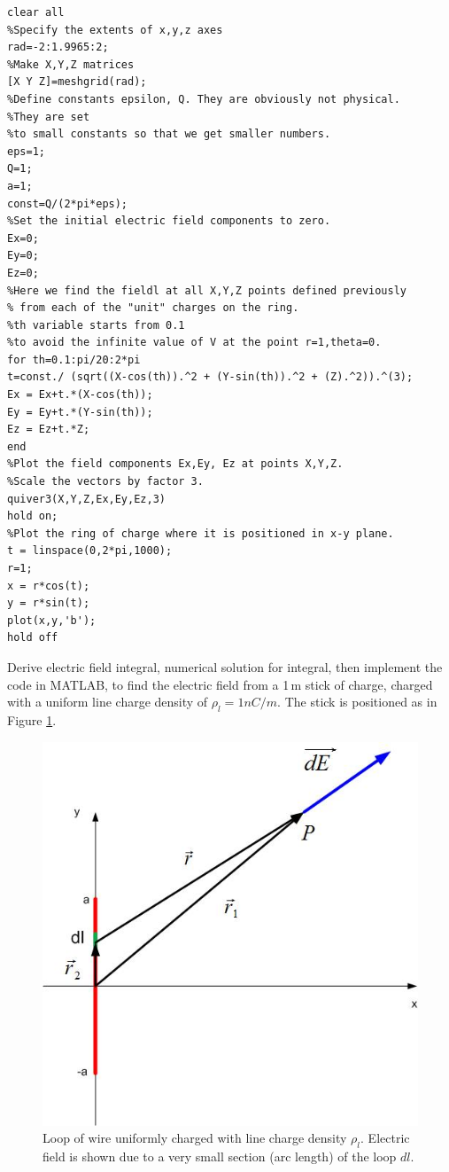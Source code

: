 \documentclass{ximera}
\begin{document}
\begin{verbatim}
clear all
%Specify the extents of x,y,z axes
rad=-2:1.9965:2;
%Make X,Y,Z matrices
[X Y Z]=meshgrid(rad);
%Define constants epsilon, Q. They are obviously not physical. 
%They are set
%to small constants so that we get smaller numbers.
eps=1;
Q=1;
a=1;
const=Q/(2*pi*eps);
%Set the initial electric field components to zero. 
Ex=0;
Ey=0;
Ez=0;
%Here we find the fieldl at all X,Y,Z points defined previously
% from each of the "unit" charges on the ring. 
%th variable starts from 0.1
%to avoid the infinite value of V at the point r=1,theta=0.
for th=0.1:pi/20:2*pi
t=const./ (sqrt((X-cos(th)).^2 + (Y-sin(th)).^2 + (Z).^2)).^(3);
Ex = Ex+t.*(X-cos(th));
Ey = Ey+t.*(Y-sin(th));
Ez = Ez+t.*Z;
end
%Plot the field components Ex,Ey, Ez at points X,Y,Z. 
%Scale the vectors by factor 3.
quiver3(X,Y,Z,Ex,Ey,Ez,3)
hold on;
%Plot the ring of charge where it is positioned in x-y plane.
t = linspace(0,2*pi,1000);
r=1;
x = r*cos(t);
y = r*sin(t);
plot(x,y,'b');
hold off
\end{verbatim}

\begin{example} Derive electric field integral,  numerical solution for integral, then implement the code in MATLAB, to find the electric field from a 1\,m stick of charge, charged with a uniform line charge density of $\rho_l=1nC/m$. The stick is positioned as in Figure \ref{stickf}.

\begin{figure}[h!]
\begin{center}
\includegraphics[scale=0.5]{../jpg/stickf.jpg}
\caption{\label{stickf} Loop of wire uniformly charged with line charge density $\rho_l$. Electric field is shown due to a very small section (arc length) of the loop $dl$.}
\end{center}
\end{figure}

\end{example}
\end{document}
